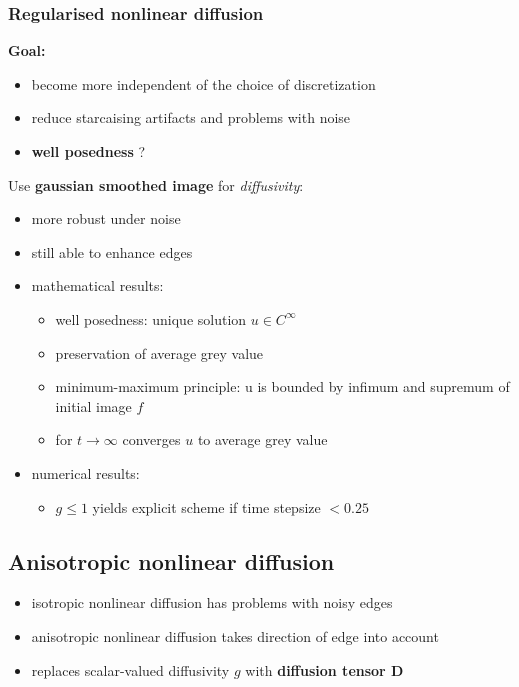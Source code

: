 \documentclass[11pt]{article}
\begin{document}
\subsubsection{Regularised nonlinear diffusion}
\label{sec-7-1-2}
\textbf{Goal:}
\begin{itemize}
\item become more independent of the choice of discretization
\item reduce starcaising artifacts and problems with noise
\item \textbf{well posedness} ?
\end{itemize}
Use \textbf{gaussian smoothed image} for \emph{diffusivity}:
\begin{itemize}
\item more robust under noise
\item still able to enhance edges
\item mathematical results:
\begin{itemize}
\item well posedness: unique solution $u \in C^\infty$
\item preservation of average grey value
\item minimum-maximum principle: u is bounded by infimum and supremum of initial image $f$
\item for $t \rightarrow \infty$ converges $u$ to average grey value
\end{itemize}
\item numerical results:
\begin{itemize}
\item $g\leq 1$ yields explicit scheme if time stepsize $< 0.25$
\end{itemize}
\end{itemize}

\subsection{Anisotropic nonlinear diffusion}
\label{sec-7-2}
\begin{itemize}
\item isotropic nonlinear diffusion has problems with noisy edges
\item anisotropic nonlinear diffusion takes direction of edge into account
\item replaces scalar-valued diffusivity $g$ with \textbf{diffusion tensor D}
\end{itemize}
\end{document}

